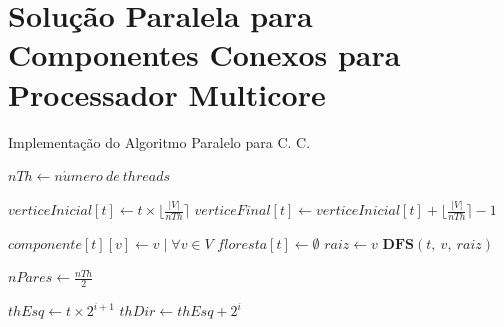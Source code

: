 \documentclass[12pt]{article}
\begin{document}
\section{Solução Paralela para Componentes Conexos para Processador Multicore}

\begin{algorithm}
    \DontPrintSemicolon
    \caption{Implementação do Algoritmo Paralelo para C. C.}
    {
        $nTh \gets n\acute{u}mero\ de\ threads$\;

        {
        	$verticeInicial[t] \gets t \times \lfloor \frac{|V|}{nTh} \rceil$\;
        	$verticeFinal[t] \gets verticeInicial[t] + \lfloor \frac{|V|}{nTh} \rceil-1$\;
        }
        
        
        {
        
            $componente[t][v] \gets v \mid \forall v \in V$\;
            $floresta[t] \gets \emptyset$\;
            {
                {
                    $raiz \gets v$\;
                    $\textbf{DFS}(t,\ v,\ raiz)$\;
                }
            }
        }
        
        $nPares \gets \frac{nTh}{2}$\;
        {
            {
                $thEsq \gets t \times 2^{i+1}$\;
                $thDir \gets thEsq + 2^i$\;
                
}}}
\end{algorithm}
\end{document}
